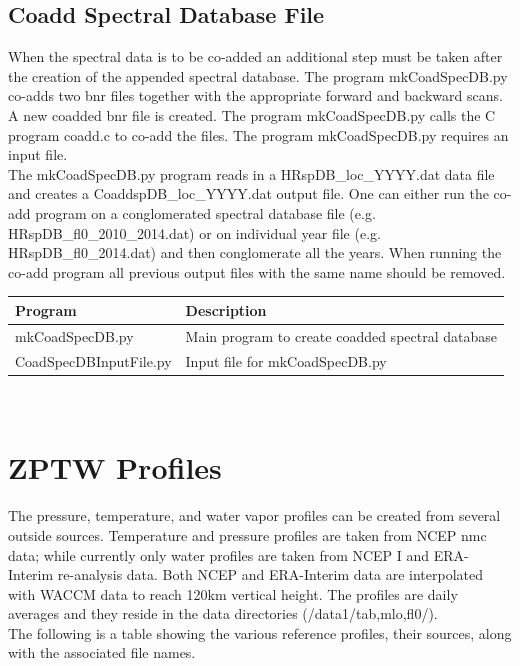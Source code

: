 \documentclass[12pt, letterpaper]{article}
\begin{document}
\subsection{Coadd Spectral Database File}
\label{sec:CSDF}
When the spectral data is to be co-added an additional step must be taken after the creation of the appended spectral database. The program mkCoadSpecDB.py co-adds two bnr files together with the appropriate forward and backward scans. A new coadded bnr file is created. The program mkCoadSpecDB.py calls the C program coadd.c to co-add the files. The program mkCoadSpecDB.py requires an input file.\\

The mkCoadSpecDB.py program reads in a HRspDB\_loc\_YYYY.dat data file and creates a CoaddspDB\_loc\_YYYY.dat output file. One can either run the co-add program on a conglomerated spectral database file (e.g. HRspDB\_fl0\_2010\_2014.dat) or on individual year file (e.g. HRspDB\_fl0\_2014.dat) and then conglomerate all the years. When running the co-add program all previous output files with the same name should be removed.\\

\begin{tabular}{ l l }
\textbf{Program} & \textbf{Description} \\
\hline
mkCoadSpecDB.py     & Main program to create coadded spectral database\\
CoadSpecDBInputFile.py & Input file for mkCoadSpecDB.py
\end{tabular} \\


\section{ZPTW Profiles}
The pressure, temperature, and water vapor profiles can be created from several outside sources. Temperature and pressure profiles are taken from NCEP nmc data; while currently only water profiles are taken from NCEP I and ERA-Interim re-analysis data. Both NCEP and ERA-Interim data are interpolated with WACCM data to reach 120km vertical height. The profiles are daily averages and they reside in the data directories (/data1/tab,mlo,fl0/).\\

The following is a table showing the various reference profiles, their sources, along with the associated file names.\\
\end{document}
